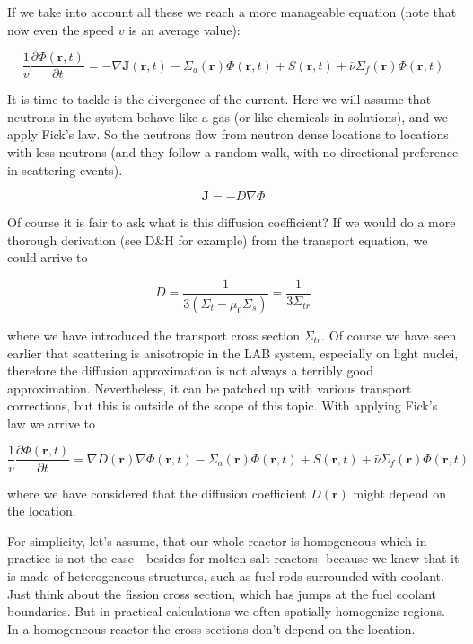 If we take into account all these we reach a more manageable equation (note that now even the speed $v$ is an average value):
    
\begin{equation}
\frac{1}{v}\frac{\partial\Phi(\mathbf{r},t)}{\partial t}=-\nabla \mathbf{J}(\mathbf{r},t)-\Sigma_a(\mathbf{r})\Phi(\mathbf{r},t)+S(\mathbf{r},t) 
+\bar\nu\Sigma_f(\mathbf{r})\Phi(\mathbf{r},t)
\end{equation}


It is time to tackle is the divergence of the current. Here we will assume that neutrons in the system behave like a gas (or like chemicals in solutions), and we apply Fick's law. So the neutrons flow from neutron dense locations to locations with less neutrons (and they follow a random walk, with no directional preference in scattering events).

\begin{equation}
\mathbf{J}=-D\nabla \Phi
\end{equation}

Of course it is fair to ask what is this diffusion coefficient? If we would do a more thorough derivation (see D\&H for example) from the transport equation, we could arrive to

\begin{equation}
D=\frac{1}{3(\Sigma_t-\mu_0\Sigma_s)}=\frac{1}{3\Sigma_{tr}}
\end{equation}

\noindent where we have introduced the transport cross section $\Sigma_{tr}$. Of course we have seen earlier that scattering is anisotropic in the LAB system, especially on light nuclei, therefore the diffusion approximation is not always a terribly good approximation. Nevertheless, it can be patched up with various transport corrections, but this is outside of the scope of this topic. With applying Fick's law we arrive to

\begin{equation}
\frac{1}{v}\frac{\partial\Phi(\mathbf{r},t)}{\partial t}=\nabla D(\mathbf{r})\nabla \Phi(\mathbf{r},t)-\Sigma_a(\mathbf{r})\Phi(\mathbf{r},t)+S(\mathbf{r},t) 
+\bar\nu\Sigma_f(\mathbf{r})\Phi(\mathbf{r},t)
\end{equation}

\noindent where we have considered that the diffusion coefficient $D(\mathbf{r})$ might depend on the location. 

For simplicity, let's assume, that our whole reactor is homogeneous which in practice is not the case - besides for molten salt reactors- because we knew that it is made of heterogeneous structures, such as fuel rods surrounded with coolant. Just think about the fission cross section, which has jumps at the fuel coolant boundaries. But in practical calculations we often spatially homogenize regions. In a homogeneous reactor the cross sections don't depend on the location. 

